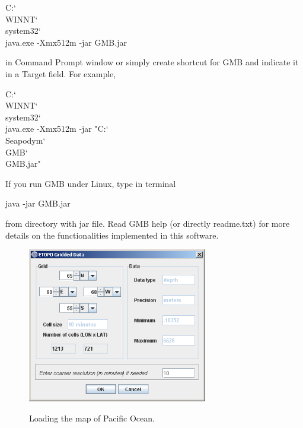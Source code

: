 \vspace{0.5cm}
{\ttfamily C:\char`\\WINNT\char`\\system32\char`\\java.exe -Xmx512m -jar GMB.jar}
\vspace{0.35cm}

\noindent in Command Prompt window or simply create shortcut for GMB and indicate it in a Target field. For example,

\vspace{0.5cm}
{\ttfamily C:\char`\\WINNT\char`\\system32\char`\\java.exe -Xmx512m -jar "C:\char`\\Seapodym\char`\\GMB\char`\\GMB.jar" }
\vspace{0.35cm}

\noindent If you run GMB under Linux, type in terminal

\vspace{0.5cm}
{\ttfamily java -jar GMB.jar}
\vspace{0.35cm}

\noindent from directory with jar file. Read GMB help (or directly {\ttfamily readme.txt}) for more details on the functionalities implemented in this software. 

\begin{figure}[t]
   \centering
    \vbox{
    \includegraphics[width=0.7\textwidth]{annexes/figs/GMB-etopo}\\
   }
   \caption{{\bfseries} Loading the map of Pacific Ocean.}
   \label{fig:etopo}
 \end{figure}

